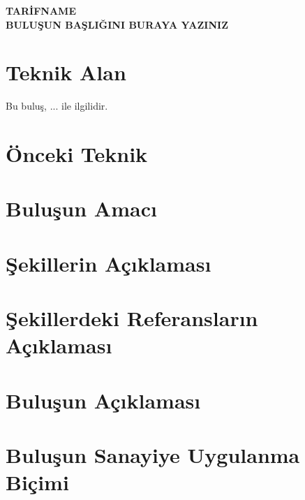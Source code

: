 
\begin{center}
    \textbf{TARİFNAME} \\
    \vspace{1em}
    \textbf{BULUŞUN BAŞLIĞINI BURAYA YAZINIZ}
\end{center}

\section*{Teknik Alan}
Bu buluş, ... ile ilgilidir.

\section*{Önceki Teknik}

\section*{Buluşun Amacı}

\section*{Şekillerin Açıklaması}

\section*{Şekillerdeki Referansların Açıklaması}

\section*{Buluşun Açıklaması}

\section*{Buluşun Sanayiye Uygulanma Biçimi}
